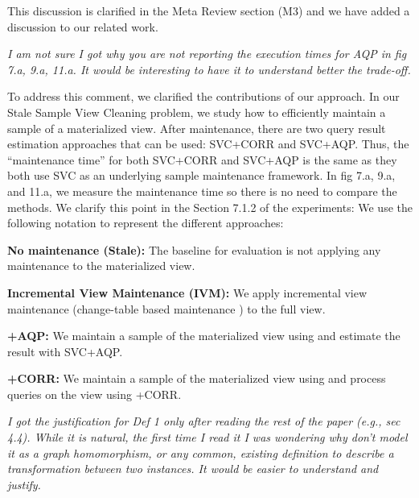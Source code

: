 This discussion is clarified in the Meta Review section (M3) and we have added a discussion to our related work.

\vspace{1em}
\emph{I am not sure I got why you are not reporting the execution times for AQP in fig 7.a, 9.a, 11.a. It would be interesting to have it to understand better the trade-off.}

To address this comment, we clarified the contributions of our approach. In our Stale Sample View Cleaning problem, we study how to efficiently maintain a sample of a materialized view. After maintenance, there are two query result estimation approaches that can be used: SVC+CORR and SVC+AQP. Thus, the “maintenance time” for both SVC+CORR and SVC+AQP is the same as they both use SVC as an underlying sample maintenance framework.  In fig 7.a, 9.a, and 11.a, we measure the maintenance time so there is no need to compare the methods. We clarify this point in the Section 7.1.2 of the experiments:
We use the following notation to represent the different approaches:
\begin{displayquote}
\noindent\textbf{No maintenance (Stale): } The baseline for evaluation is not applying any maintenance to the materialized view.

\noindent\textbf{Incremental View Maintenance (IVM): } We apply incremental view maintenance (change-table based maintenance \cite{gupta2006incremental}) to the full view.

\noindent\textbf{\svcnospace+AQP: } We maintain a sample of the materialized view using \svc and estimate the result with SVC+AQP.

\noindent\textbf{\svcnospace+CORR: } We maintain a sample of the materialized view using \svc and process queries on the view using \svcnospace+CORR.
\end{displayquote}

\vspace{1em}
\emph{I got the justification for Def 1 only after reading the rest of the paper (e.g., sec 4.4). While it is natural, the first time I read it I was wondering why don't model it as a graph homomorphism, or any common, existing definition to describe a transformation between two instances. It would be easier to understand and justify.}

